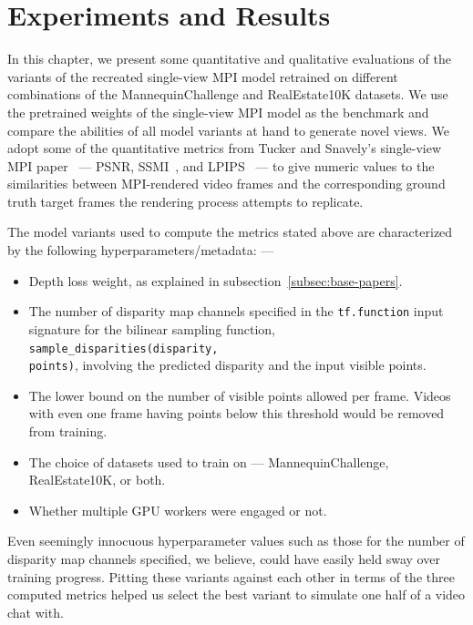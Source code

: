 \chapter{Experiments and Results}\label{ch4:experiments-results}

In this chapter, we present some quantitative and qualitative evaluations of the variants of the recreated single-view MPI model retrained on different combinations of the MannequinChallenge and RealEstate10K datasets. We use the pretrained weights of the single-view MPI model as the benchmark and compare the abilities of all model variants at hand to generate novel views. We adopt some of the quantitative metrics from Tucker and Snavely's single-view MPI paper~\cite{single_view_mpi} --- PSNR, SSMI~\cite{wang_image_2004}, and LPIPS~\cite{zhang_unreasonable_2018} --- to give numeric values to the similarities between MPI-rendered video frames and the corresponding ground truth target frames the rendering process attempts to replicate.

The model variants used to compute the metrics stated above are characterized by the following hyperparameters/metadata: ---
\begin{itemize}
    \item Depth loss weight, as explained in subsection~\ref{subsec:base-papers}.
    \item The number of disparity map channels specified in the \texttt{tf.function} input signature for the bilinear sampling function, \texttt{sample\_disparities(disparity,\\points)}, involving the predicted disparity and the input visible points.
    \item The lower bound on the number of visible points allowed per frame. Videos with even one frame having points below this threshold would be removed from training.
    \item The choice of datasets used to train on --- MannequinChallenge, RealEstate10K, or both.
    \item Whether multiple GPU workers were engaged or not.
\end{itemize}
Even seemingly innocuous hyperparameter values such as those for the number of disparity map channels specified, we believe, could have easily held sway over training progress. Pitting these variants against each other in terms of the three computed metrics helped us select the best variant to simulate one half of a video chat with.


